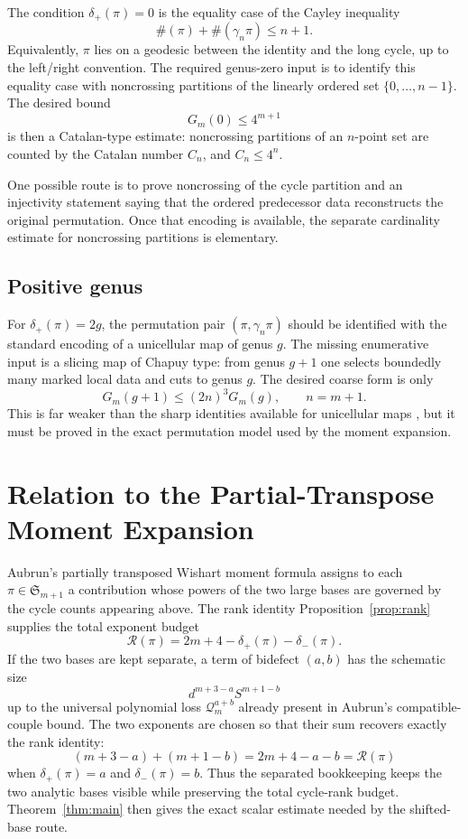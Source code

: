 \documentclass[11pt]{article}
\numberwithin{equation}{section}
\newcommand{\Sym}{\mathfrak S}
\newcommand{\cyc}{\#}
\newcommand{\gammacyc}{\gamma_n}
\newcommand{\dplus}{\delta_+}
\newcommand{\dminus}{\delta_-}
\newcommand{\rank}{\mathcal R}
\newcommand{\Qloss}{\mathcal Q}
\begin{document}
The condition \(\dplus(\pi)=0\) is the equality case of the Cayley inequality
\[
  \cyc(\pi)+\cyc(\gammacyc\pi)\le n+1.
\]
Equivalently, \(\pi\) lies on a geodesic between the identity and the long
cycle, up to the left/right convention.  The required genus-zero input is to
identify this equality case with noncrossing partitions of the linearly
ordered set \(\{0,\ldots,n-1\}\).  The desired bound
\[
  G_m(0)\le 4^{m+1}
\]
is then a Catalan-type estimate: noncrossing partitions of an \(n\)-point set
are counted by the Catalan number \(C_n\), and \(C_n\le4^n\).

One possible route is to prove noncrossing of the cycle partition and an
injectivity statement saying that the ordered predecessor data reconstructs
the original permutation.  Once that encoding is available, the separate
cardinality estimate for noncrossing partitions is elementary.

\subsection{Positive genus}

For \(\dplus(\pi)=2g\), the permutation pair \((\pi,\gammacyc\pi)\) should be
identified with the standard encoding of a unicellular map of genus \(g\).  The
missing enumerative input is a slicing map of Chapuy type: from genus \(g+1\)
one selects boundedly many marked local data and cuts to genus \(g\).  The
desired coarse form is only
\[
  G_m(g+1)\le (2n)^3G_m(g),
  \qquad n=m+1.
\]
This is far weaker than the sharp identities available for unicellular maps
\cite{Chapuy2011}, but it must be proved in the exact permutation model used
by the moment expansion.

\section{Relation to the Partial-Transpose Moment Expansion}

Aubrun's partially transposed Wishart moment formula assigns to each
\(\pi\in\Sym_{m+1}\) a contribution whose powers of the two large bases are
governed by the cycle counts appearing above.  The rank identity
Proposition~\ref{prop:rank} supplies the total exponent budget
\[
  \rank(\pi)=2m+4-\dplus(\pi)-\dminus(\pi).
\]
If the two bases are kept separate, a term of bidefect \((a,b)\) has the
schematic size
\[
  d^{m+3-a}S^{m+1-b}
\]
up to the universal polynomial loss \(\Qloss_m^{a+b}\) already present in
Aubrun's compatible-couple bound.  The two exponents are chosen so that their
sum recovers exactly the rank identity:
\[
  (m+3-a)+(m+1-b)=2m+4-a-b=\rank(\pi)
\]
when \(\dplus(\pi)=a\) and \(\dminus(\pi)=b\).  Thus the separated
bookkeeping keeps the two analytic bases visible while preserving the total
cycle-rank budget.  Theorem~\ref{thm:main} then gives the exact scalar
estimate needed by the shifted-base route.
\end{document}
